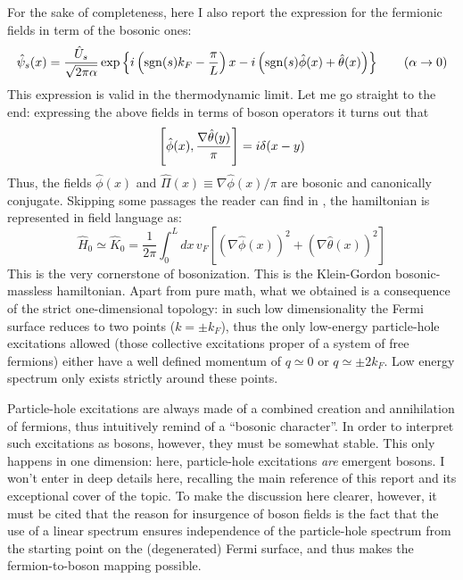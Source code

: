 For the sake of completeness, here I also report the expression for the fermionic fields in term of the bosonic ones:
\begin{equation}\label{eq:fermionic-fields-bosonic-fields-expression}
	\hat \psi_s (x) = \frac{\hat U_s}{\sqrt{2\pi\alpha}} \exp\left\{
		i \left(
			\mathrm{sgn}(s) k_F - \frac{\pi}{L}
		\right) x - i \left(
			\mathrm{sgn}(s) \hat \phi(x) + \hat \theta(x)
		\right)
	\right\}
	\qquad\left( \alpha \to 0 \right)
\end{equation}
This expression is valid in the thermodynamic limit. Let me go straight to the end: expressing the above fields in terms of boson operators it turns out that
\[
	\comm{\hat \phi(x)}{\frac{\nabla \hat \theta(y)}{\pi}} = i \delta(x-y)
\]
Thus, the fields $\hat \phi(x)$ and $\hat \Pi(x) \equiv \nabla \hat \phi(x)/\pi$ are bosonic and canonically conjugate.
Skipping some passages the reader can find in \cite[Chap.~2]{giamarchi2003quantum}, the hamiltonian is represented in field language as:
\begin{equation}\label{eq:free-field-hamiltonian}
	\hat H_0 \simeq \hat K_0 = \frac{1}{2\pi} \int_0^L dx \, v_F \left[ \left( \nabla \hat \phi(x) \right)^2 + \left( \nabla \hat \theta(x) \right)^2 \right]
\end{equation}
This is the very cornerstone of bosonization. This is the Klein-Gordon bosonic-massless hamiltonian. Apart from pure math, what we obtained is a consequence of the strict one-dimensional topology: in such low dimensionality the Fermi surface reduces to two points ($k=\pm k_F$), thus the only low-energy particle-hole excitations allowed (those collective excitations proper of a system of free fermions) either have a well defined momentum of $q \simeq 0$ or $q \simeq \pm 2k_F$. Low energy spectrum only exists strictly around these points.

Particle-hole excitations are always made of a combined creation and annihilation of fermions, thus intuitively remind of a ``bosonic character''. In order to interpret such excitations as bosons, however, they must be somewhat stable. This only happens in one dimension: here, particle-hole excitations \textit{are} emergent bosons. I won't enter in deep details here, recalling the main reference of this report \cite{giamarchi2003quantum} and its exceptional cover of the topic. To make the discussion here clearer, however, it must be cited that the reason for insurgence of boson fields is the fact that the use of a linear spectrum ensures independence of the particle-hole spectrum from the starting point on the (degenerated) Fermi surface, and thus makes the fermion-to-boson mapping possible.

